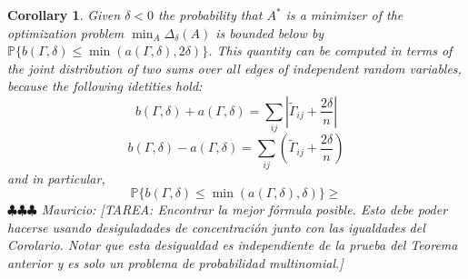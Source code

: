 \documentclass[12pt]{amsart}
\newtheorem{cor}[lemma]{Corollary}
\theoremstyle{remark}
\newcommand{\mv}[1]{{\color{red} \sf $\clubsuit\clubsuit\clubsuit$ Mauricio: [#1]}}
\begin{document}
\begin{cor} Given $\delta<0$ the probability that $A^*$ is a minimizer of the optimization problem $\min_A\Delta_{\delta}(A)$ is bounded below by $\mathbb{P}\{ b(\Gamma,\delta)\leq \min \left(a(\Gamma,\delta), 2\delta\right)\}$.  
This quantity can be computed in terms of the joint distribution of two sums over all edges of independent random variables, because the following idetities hold:
\[b(\Gamma,\delta)+a(\Gamma,\delta)=\sum_{ij} \left|\widetilde{\Gamma}_{ij}+\frac{2\delta}{n}\right|\]
\[b(\Gamma,\delta)-a(\Gamma,\delta)=\sum_{ij} \left(\widetilde{\Gamma}_{ij}+\frac{2\delta}{n}\right)\]
and in particular, 
\[\mathbb{P}\{ b(\Gamma,\delta)\leq \min \left(a(\Gamma,\delta), \delta\right)\}\geq \]  
\mv{TAREA: Encontrar la mejor f\'ormula posible. Esto debe poder hacerse usando desiguladades de concentraci\'on junto con las igualdades del Corolario. Notar que esta desigualdad es independiente de la prueba del Teorema anterior y es solo un problema de probabilidad multinomial.}
\end{cor}
\end{document}

